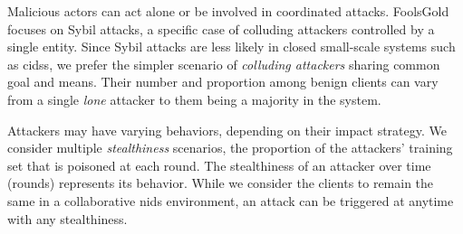 
Malicious actors can act alone or be involved in coordinated attacks.
FoolsGold~\cite{fung_limitations_2020} focuses on Sybil attacks, a specific case of colluding attackers controlled by a single entity.
Since Sybil attacks are less likely in closed small-scale systems such as \glspl{cids}, we prefer the simpler scenario of \emph{colluding attackers} sharing common goal and means.
Their number and proportion among benign clients can vary from a single \emph{lone} attacker to them being a majority in the system.%





Attackers may have varying behaviors, depending on their impact strategy.
We consider multiple \emph{stealthiness} scenarios, \ie the proportion of the attackers' training set that is poisoned at each round.
The stealthiness of an attacker over time (\ie rounds) represents its behavior.
While we consider the clients to remain the same in a collaborative \gls{nids} environment, an attack can be triggered at anytime with any stealthiness.

